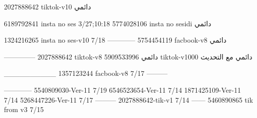 2027888642 tiktok-v10
دائمي

6189792841 insta no ses
3/27;10:18
5774028106 insta no sesidi
دائمي

1324216265 insta no ses-v10
7/18
------------
5754454119 facbook-v8
دائمي


--------------
2027888642 tiktok-v8
دائمي
5909533996 tiktok-v1000
دائمي مع التحديث

__________
1357123244 facbook-v8
7/17
---------

------------
5540809030-Ver-11
7/19
6546523654-Ver-11
7/14
1871425109-Ver-11
7/14
5268447226-Ver-11
7/17
---------
2027888642-tik-v1
7/14
------
5460890865 tik from v3
7/15

